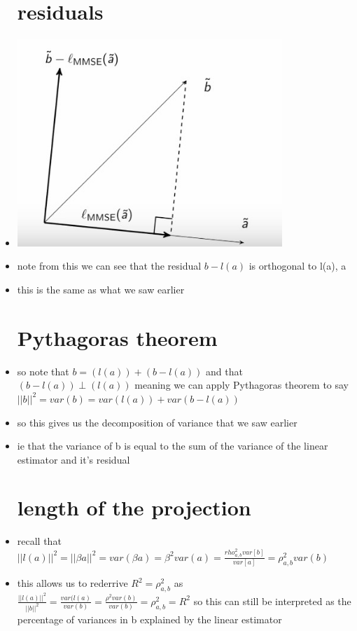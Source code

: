 \documentclass{article}
\begin{document}
\begin{itemize}
\section{residuals}
\item \includegraphics[width=10cm]{notes/week_2/geometric_3.jpg}
\item note from this we can see that the residual $b-l(a)$ is orthogonal to l(a), a
\item this is the same as what we saw earlier 
\section{Pythagoras theorem }
\item so note that $b=(l(a))+(b-l(a))$ and that$(b-l(a))\perp(l(a))$ meaning we can apply Pythagoras theorem to say  $||b||^2=var(b)= var(l(a))+var(b-l(a))$
\item so this gives us the decomposition of variance that we saw earlier 
\item ie that the variance of b is equal to the sum of the variance of the linear estimator and it's residual 
\section{length of the projection}
\item recall that $||l(a)||^2=||\beta a||^2=var(\beta a)=\beta^2var(a)=\frac{rho_{a,b}^2var[b]}{var[a]}=\rho_{a,b}^2var(b)$
\item this allows us to rederrive $R^2=\rho_{a,b}^2$ as $\frac{||l(a)||^2}{||b||^2}=\frac{var(l(a)}{var(b)}=\frac{\rho^2var(b)}{var(b)}=\rho_{a,b}^2=R^2$ so this can still be interpreted as the percentage of variances in b explained by the linear estimator 
\end{itemize}
\end{document}
